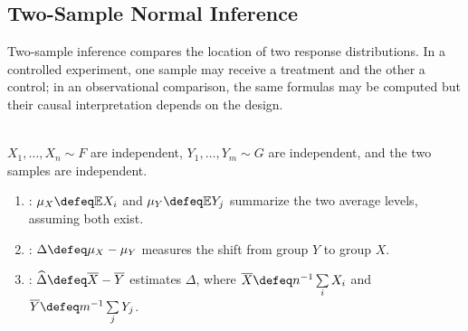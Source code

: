 \subsection{Two-Sample Normal Inference}

Two-sample inference compares the location of two response distributions.  In a controlled experiment, one sample may receive a treatment and the other a control; in an observational comparison, the same formulas may be computed but their causal interpretation depends on the design.

\begin{definition} \label{def:two-independent-sample-location-model} \\
$X_1,\ldots,X_n\sim F$ are independent, $Y_1,\ldots,Y_m\sim G$ are independent, and the two samples are independent.
\begin{enumerate}[label=(\roman*)]
\setlength{\itemsep}{0pt}
\item {}: $\mu_X\defeq\mathbb{E}X_i$ and $\mu_Y\defeq\mathbb{E}Y_j$ summarize the two average levels, assuming both exist.
\item {}: $\Delta\defeq\mu_X-\mu_Y$ measures the shift from group $Y$ to group $X$.
\item {}: $\widehat{\Delta}\defeq\overline{X}-\overline{Y}$ estimates $\Delta$, where $\overline{X}\defeq n^{-1}\sum\limits_iX_i$ and $\overline{Y}\defeq m^{-1}\sum\limits_jY_j$.
\end{enumerate}
\end{definition}

